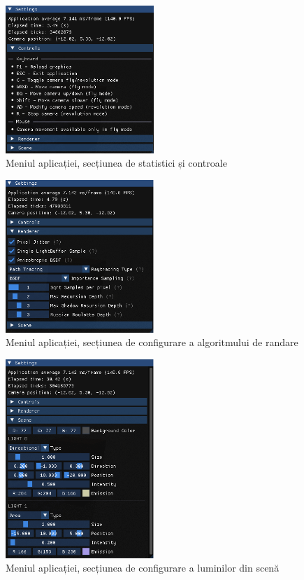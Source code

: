 \documentclass[12pt,a4paper]{report}
\numberwithin{equation}{section} %
\begin{document}
\begin{figure}[!htb]
	\centering
	\includegraphics[width=0.5\textwidth]{pics/imgui-controls.png}
	\caption{Meniul aplicației, secțiunea de statistici și controale}
	\label{fig:imgui-controls}
\end{figure}
\begin{figure}[!htb]
	\centering
	\includegraphics[width=0.5\textwidth]{pics/imgui-renderer.png}
	\caption{Meniul aplicației, secțiunea de configurare a algoritmului de randare}
	\label{fig:imgui-renderer}
\end{figure}
\begin{figure}[!htb]
	\centering
	\includegraphics[width=0.5\textwidth]{pics/imgui-scene.png}
	\caption{Meniul aplicației, secțiunea de configurare a luminilor din scenă}
	\label{fig:imgui-scene}
\end{figure}
\end{document}
